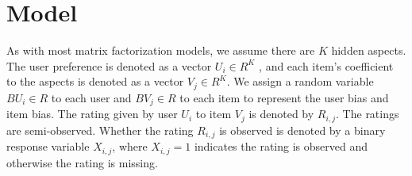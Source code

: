 \documentclass[sigconf]{acmart}
\begin{document}
\section{Model}\label{sec:model}





As with most matrix factorization models, we assume there are $K$ hidden aspects. The user preference is denoted as a vector $U_i\in R^K$ , and each item's coefficient to the aspects is denoted as a vector $V_j \in R^K$. We assign a random variable $BU_i\in R$ to each user and $BV_j\in R$ to each item to represent the user bias and item bias. The rating given by user $U_i$ to item $V_j$ is denoted by $R_{i,j}$. The ratings are semi-observed. Whether the rating $R_{i,j}$ is observed is denoted by a binary response variable $X_{i,j}$, where $X_{i,j}=1$ indicates the rating is observed and otherwise the rating is missing.
\end{document}
